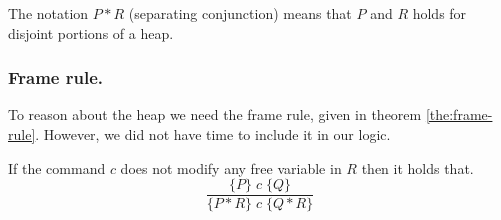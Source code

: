 \begin{defn}
The notation $P * R$ (separating conjunction) means that $P$ and $R$ holds for disjoint portions of a heap.
\end{defn}

\subsubsection{Frame rule.}
To reason about the heap we need the frame rule, given in theorem \ref{the:frame-rule}. However, we did not have time to include it in our logic.

\begin{theorem}\label{the:frame-rule}
If the command $c$ does not modify any free variable in $R$ then it holds that.
\begin{equation}
\frac
{\{P\}\;c\;\{Q\}}
{\{P * R\}\; c \; \{Q * R\}}
\end{equation}
\end{theorem}

